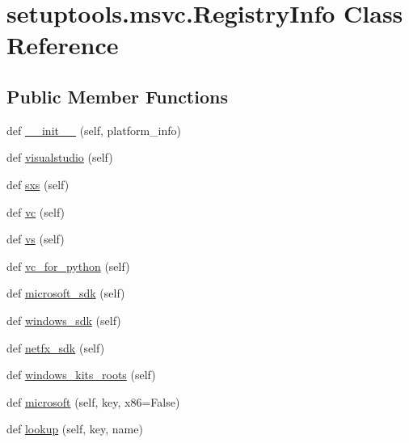 \hypertarget{classsetuptools_1_1msvc_1_1RegistryInfo}{}\section{setuptools.\+msvc.\+Registry\+Info Class Reference}
\label{classsetuptools_1_1msvc_1_1RegistryInfo}
\subsection*{Public Member Functions}
\begin{DoxyCompactItemize}
\item 
def \hyperlink{classsetuptools_1_1msvc_1_1RegistryInfo_aaf1543da0051dd15ff1198de8fb00dd6}{\+\_\+\+\_\+init\+\_\+\+\_\+} (self, platform\+\_\+info)
\item 
def \hyperlink{classsetuptools_1_1msvc_1_1RegistryInfo_a0b1853b483f8b7be15c5eb2ee344d856}{visualstudio} (self)
\item 
def \hyperlink{classsetuptools_1_1msvc_1_1RegistryInfo_a506b2764762140308133a06a02d4285a}{sxs} (self)
\item 
def \hyperlink{classsetuptools_1_1msvc_1_1RegistryInfo_a15b2a92fa7a73cdab831a78bddeaa9ce}{vc} (self)
\item 
def \hyperlink{classsetuptools_1_1msvc_1_1RegistryInfo_a2316fd853eba9e0738e067fe1cb50941}{vs} (self)
\item 
def \hyperlink{classsetuptools_1_1msvc_1_1RegistryInfo_a0b3312fb81aa1413b38c3b334330e008}{vc\+\_\+for\+\_\+python} (self)
\item 
def \hyperlink{classsetuptools_1_1msvc_1_1RegistryInfo_a5ad942fb235475bd805634ca70652f38}{microsoft\+\_\+sdk} (self)
\item 
def \hyperlink{classsetuptools_1_1msvc_1_1RegistryInfo_a8702bae8743189fe1c6d3fe77a9f4aa1}{windows\+\_\+sdk} (self)
\item 
def \hyperlink{classsetuptools_1_1msvc_1_1RegistryInfo_aef785998a7042430dbf6ec449a11d4d8}{netfx\+\_\+sdk} (self)
\item 
def \hyperlink{classsetuptools_1_1msvc_1_1RegistryInfo_a2fd49f19b9bbfd439af3f9ab604a47ce}{windows\+\_\+kits\+\_\+roots} (self)
\item 
def \hyperlink{classsetuptools_1_1msvc_1_1RegistryInfo_ac7992b4e588edd0aebb0a33fa266ebc8}{microsoft} (self, key, x86=False)
\item 
def \hyperlink{classsetuptools_1_1msvc_1_1RegistryInfo_afc91b9bf7451e111733eebb84a3b27f6}{lookup} (self, key, name)
\end{DoxyCompactItemize}
